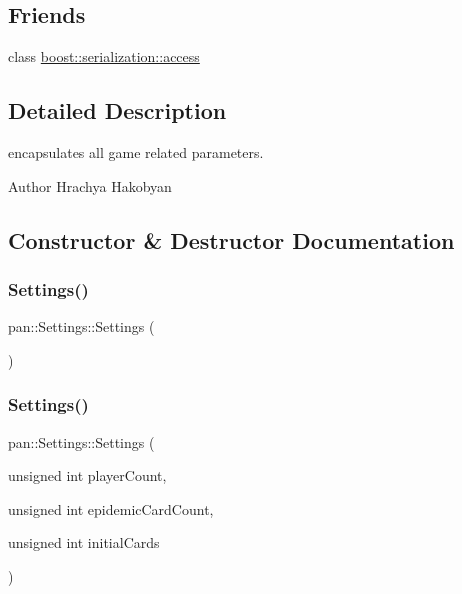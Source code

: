 \subsection*{Friends}
\begin{DoxyCompactItemize}
\item 
class \hyperlink{classpan_1_1_settings_ac98d07dd8f7b70e16ccb9a01abf56b9c}{boost\+::serialization\+::access}
\end{DoxyCompactItemize}


\subsection{Detailed Description}
encapsulates all game related parameters. 

\begin{DoxyAuthor}{Author}
Hrachya Hakobyan 
\end{DoxyAuthor}


\subsection{Constructor \& Destructor Documentation}
\mbox{\label{classpan_1_1_settings_af5bdfa4c3ed9460b0290d9f3d0aee02a}} 
\subsubsection{\texorpdfstring{Settings()}{Settings()}\hspace{0.1cm}{\footnotesize\ttfamily [1/2]}}
{\footnotesize\ttfamily pan\+::\+Settings\+::\+Settings (\begin{DoxyParamCaption}{ }\end{DoxyParamCaption})}

\mbox{\label{classpan_1_1_settings_a88e5d34527d110fd6391df762199c405}} 
\subsubsection{\texorpdfstring{Settings()}{Settings()}\hspace{0.1cm}{\footnotesize\ttfamily [2/2]}}
{\footnotesize\ttfamily pan\+::\+Settings\+::\+Settings (\begin{DoxyParamCaption}\item[{unsigned int}]{player\+Count,  }\item[{unsigned int}]{epidemic\+Card\+Count,  }\item[{unsigned int}]{initial\+Cards }\end{DoxyParamCaption})}

